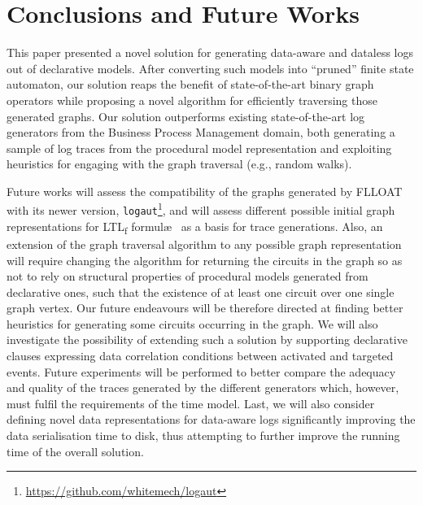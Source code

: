 \documentclass[sigconf]{acmart}
\newcommand{\LTLf}{\textup{LTL}\textsubscript{f}\xspace}
\begin{document}
\section{Conclusions and Future Works}\label{sec:conclfut}
This paper presented a novel solution for generating data-aware and dataless logs out of declarative models. After converting such models into ``pruned'' finite state automaton, our solution reaps the benefit of state-of-the-art binary graph operators while proposing a novel algorithm for efficiently traversing those generated graphs. Our solution outperforms existing state-of-the-art log generators from the Business Process Management domain, both generating a sample of log traces from the procedural model representation and exploiting heuristics for engaging with the graph traversal (e.g., random walks).

Future works will assess the compatibility of the graphs generated by FLLOAT with its newer version, \texttt{logaut}\footnote{\url{https://github.com/whitemech/logaut}}, and will assess different possible initial graph representations for \LTLf formul\ae~ as a basis for trace generations. Also, an extension of the graph traversal algorithm to any possible graph representation will require changing the algorithm for returning the circuits in the graph so as not to rely on structural properties of procedural models generated from declarative ones, such that the existence of at least one circuit over one single graph vertex. Our future endeavours will be therefore directed at finding better heuristics for generating some circuits occurring in the graph. We will also investigate the possibility of extending such a solution by supporting declarative clauses expressing data correlation conditions between activated and targeted events.  Future experiments will be performed to better compare the adequacy and quality of the traces generated by the different generators which, however, must fulfil the requirements of the time model. Last, we will also consider defining novel data representations for data-aware logs significantly improving the data serialisation time to disk, thus attempting to further improve the running time of the overall solution.




\end{document}
